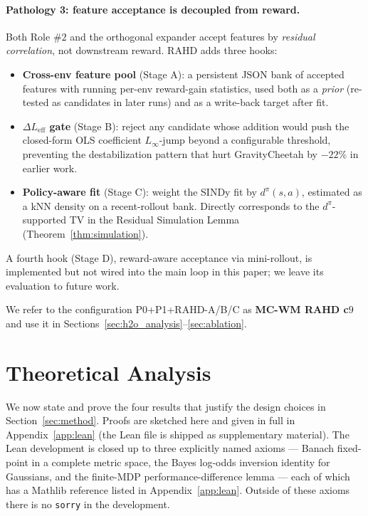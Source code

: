 \documentclass{article}
\theoremstyle{definition}
\begin{document}
\paragraph{Pathology 3: feature acceptance is decoupled from reward.}
Both Role \#$2$ and the orthogonal expander accept features by
\emph{residual correlation}, not downstream reward.  RAHD adds three
hooks:
\begin{itemize}
  \item \textbf{Cross-env feature pool} (Stage A): a persistent JSON
    bank of accepted features with running per-env reward-gain
    statistics, used both as a \emph{prior} (re-tested as candidates
    in later runs) and as a write-back target after fit.
  \item \textbf{$\Delta L_{\mathrm{eff}}$ gate} (Stage B): reject any
    candidate whose addition would push the closed-form OLS
    coefficient $L_{\infty}$-jump beyond a configurable threshold,
    preventing the destabilization pattern that hurt
    GravityCheetah by $-22\%$ in earlier work.
  \item \textbf{Policy-aware fit} (Stage C): weight the SINDy fit by
    $d^\pi(s,a)$, estimated as a kNN density on a recent-rollout
    bank.  Directly corresponds to the $d^\pi$-supported TV in the
    Residual Simulation Lemma (Theorem~\ref{thm:simulation}).
\end{itemize}
A fourth hook (Stage D), reward-aware acceptance via mini-rollout,
is implemented but not wired into the main loop in this paper; we
leave its evaluation to future work.

We refer to the configuration P0+P1+RAHD-A/B/C as
\textbf{MC-WM RAHD c$9$} and use it in
Sections~\ref{sec:h2o_analysis}--\ref{sec:ablation}.

\section{Theoretical Analysis}
\label{sec:theory}

We now state and prove the four results that justify the design choices
in Section~\ref{sec:method}.  Proofs are sketched here and given in full
in Appendix~\ref{app:lean} (the Lean file is shipped as supplementary
material).  The Lean development is closed up to three explicitly named
axioms --- Banach fixed-point in a complete metric space, the Bayes
log-odds inversion identity for Gaussians, and the finite-MDP
performance-difference lemma --- each of which has a Mathlib reference
listed in Appendix~\ref{app:lean}.  Outside of these axioms there is no
\texttt{sorry} in the development.
\end{document}
